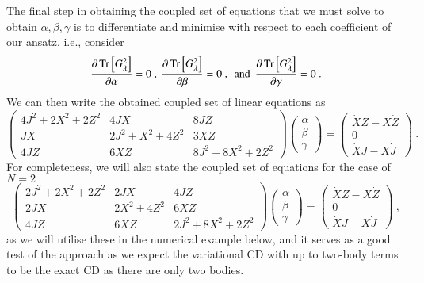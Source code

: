 The final step in obtaining the coupled set of equations that we must solve to obtain ${\alpha,\beta,\gamma}$ is to differentiate and minimise with respect to each coefficient of our ansatz, i.e., consider 
\begin{equation}
    \frac{\partial \Tr\left[G_\lambda^2\right]}{\partial\alpha} = 0 \ , \: \frac{\partial \Tr\left[G_\lambda^2\right]}{\partial\beta} = 0 \ , \: \: \mathrm{and} \: \: \frac{\partial \Tr\left[G_\lambda^2\right]}{\partial\gamma} = 0 \ . \nonumber
\end{equation}
We can then write the obtained coupled set of linear equations as
\begin{equation}
    \begin{pmatrix}
        4J^2 + 2X^2 + 2Z^2 & 4JX & 8JZ \\
        JX & 2J^2 + X^2 + 4Z^2 & 3XZ \\
        4JZ & 6XZ & 8J^2 + 8X^2 + 2Z^2
    \end{pmatrix} \begin{pmatrix}
        \alpha \\
        \beta \\
        \gamma
    \end{pmatrix} = \begin{pmatrix}
        \dot{X}Z - X\dot{Z} \\
        0 \\
        \dot{X}J-X\dot{J}
    \end{pmatrix}\ .
\end{equation}
For completeness, we will also state the coupled set of equations for the case of $N=2$
\begin{equation}
    \begin{pmatrix}
        2J^2 + 2X^2 + 2Z^2 & 2JX & 4JZ \\
        2JX & 2X^2 + 4Z^2 & 6XZ \\
        4JZ & 6XZ & 2J^2 + 8X^2 + 2Z^2
    \end{pmatrix} \begin{pmatrix}
        \alpha \\
        \beta \\
        \gamma
    \end{pmatrix} = \begin{pmatrix}
        \dot{X}Z - X\dot{Z} \\
        0 \\
        \dot{X}J-X\dot{J}
    \end{pmatrix}\ ,
\end{equation}
as we will utilise these in the numerical example below, and it serves as a good test of the approach as we expect the variational CD with up to two-body terms to be the exact CD as there are only two bodies.

